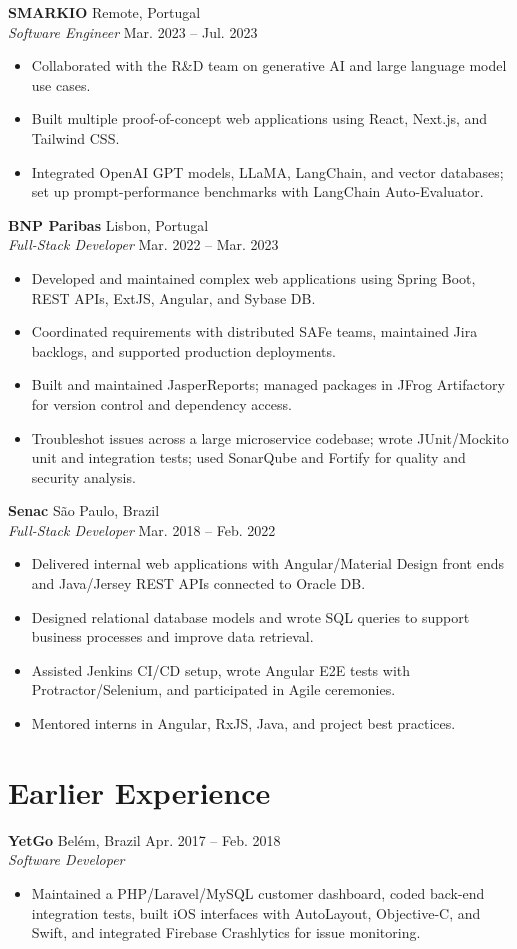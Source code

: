 \documentclass[10pt,a4paper]{article}
\newcommand{\cventry}[5]{%
  \needspace{5\baselineskip}%
  \textbf{#1} \hfill {\small\color{muted}#2}\\[-0.05em]
  {\emph{#3}} \hfill {\small\color{muted}#4}\vspace{-0.25em}
  \begin{itemize}
    #5
  \end{itemize}\vspace{0.15em}
}
\newcommand{\compactentry}[4]{%
  \needspace{3\baselineskip}%
  \textbf{#1} \hfill {\small\color{muted}#2}\\[-0.05em]
  {\emph{#3}}\vspace{-0.25em}
  \begin{itemize}
    #4
  \end{itemize}\vspace{0.05em}
}
\begin{document}
\cventry{SMARKIO }{Remote, Portugal}{Software Engineer}{Mar. 2023 -- Jul. 2023}{
  \item Collaborated with the R\&D team on generative AI and large language model use cases.
  \item Built multiple proof-of-concept web applications using React, Next.js, and Tailwind CSS.
  \item Integrated OpenAI GPT models, LLaMA, LangChain, and vector databases; set up prompt-performance benchmarks with LangChain Auto-Evaluator.
}

\cventry{BNP Paribas }{Lisbon, Portugal}{Full-Stack Developer}{Mar. 2022 -- Mar. 2023}{
  \item Developed and maintained complex web applications using Spring Boot, REST APIs, ExtJS, Angular, and Sybase DB.
  \item Coordinated requirements with distributed SAFe teams, maintained Jira backlogs, and supported production deployments.
  \item Built and maintained JasperReports; managed packages in JFrog Artifactory for version control and dependency access.
  \item Troubleshot issues across a large microservice codebase; wrote JUnit/Mockito unit and integration tests; used SonarQube and Fortify for quality and security analysis.
}

\cventry{Senac }{São Paulo, Brazil}{Full-Stack Developer}{Mar. 2018 -- Feb. 2022}{
  \item Delivered internal web applications with Angular/Material Design front ends and Java/Jersey REST APIs connected to Oracle DB.
  \item Designed relational database models and wrote SQL queries to support business processes and improve data retrieval.
  \item Assisted Jenkins CI/CD setup, wrote Angular E2E tests with Protractor/Selenium, and participated in Agile ceremonies.
  \item Mentored interns in Angular, RxJS, Java, and project best practices.
}

\section{Earlier Experience}

\compactentry{YetGo }{Belém, Brazil \textbullet{} Apr. 2017 -- Feb. 2018}{Software Developer}{
  \item Maintained a PHP/Laravel/MySQL customer dashboard, coded back-end integration tests, built iOS interfaces with AutoLayout, Objective-C, and Swift, and integrated Firebase Crashlytics for issue monitoring.
}
\end{document}
